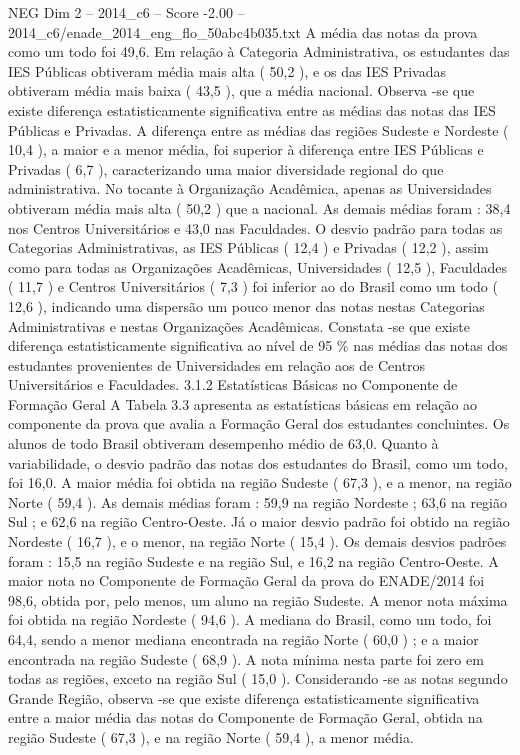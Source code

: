 \begin{textsample}{NEG Dim 2 – 2014\_c6 – Score -2.00 – 2014\_c6/enade\_2014\_eng\_flo\_50abc4b035.txt}
A média das notas da prova como um todo foi 49,6.
Em relação à Categoria Administrativa, os estudantes das IES Públicas obtiveram média mais alta ( 50,2 ), e os das IES Privadas obtiveram média mais baixa ( 43,5 ), que a média nacional.
Observa -se que existe diferença estatisticamente significativa entre as médias das notas das IES Públicas e Privadas.
A diferença entre as médias das regiões Sudeste e Nordeste ( 10,4 ), a maior e a menor média, foi superior à diferença entre IES Públicas e Privadas ( 6,7 ), caracterizando uma maior diversidade regional do que administrativa.
No tocante à Organização Acadêmica, apenas as Universidades obtiveram média mais alta ( 50,2 ) que a nacional.
As demais médias foram : 38,4 nos Centros Universitários e 43,0 nas Faculdades.
O desvio padrão para todas as Categorias Administrativas, as IES Públicas ( 12,4 ) e Privadas ( 12,2 ), assim como para todas as Organizações Acadêmicas, Universidades ( 12,5 ), Faculdades ( 11,7 ) e Centros Universitários ( 7,3 ) foi inferior ao do Brasil como um todo ( 12,6 ), indicando uma dispersão um pouco menor das notas nestas Categorias Administrativas e nestas Organizações Acadêmicas.
Constata -se que existe diferença estatisticamente significativa ao nível de 95 \% nas médias das notas dos estudantes provenientes de Universidades em relação aos de Centros Universitários e Faculdades. 3.1.2 Estatísticas Básicas no Componente de Formação Geral A Tabela 3.3 apresenta as estatísticas básicas em relação ao componente da prova que avalia a Formação Geral dos estudantes concluintes.
Os alunos de todo Brasil obtiveram desempenho médio de 63,0.
Quanto à variabilidade, o desvio padrão das notas dos estudantes do Brasil, como um todo, foi 16,0.
A maior média foi obtida na região Sudeste ( 67,3 ), e a menor, na região Norte ( 59,4 ).
As demais médias foram : 59,9 na região Nordeste ; 63,6 na região Sul ; e 62,6 na região Centro-Oeste.
Já o maior desvio padrão foi obtido na região Nordeste ( 16,7 ), e o menor, na região Norte ( 15,4 ).
Os demais desvios padrões foram : 15,5 na região Sudeste e na região Sul, e 16,2 na região Centro-Oeste.
A maior nota no Componente de Formação Geral da prova do ENADE/2014 foi 98,6, obtida por, pelo menos, um aluno na região Sudeste.
A menor nota máxima foi obtida na região Nordeste ( 94,6 ).
A mediana do Brasil, como um todo, foi 64,4, sendo a menor mediana encontrada na região Norte ( 60,0 ) ; e a maior encontrada na região Sudeste ( 68,9 ).
A nota mínima nesta parte foi zero em todas as regiões, exceto na região Sul ( 15,0 ).
Considerando -se as notas segundo Grande Região, observa -se que existe diferença estatisticamente significativa entre a maior média das notas do Componente de Formação Geral, obtida na região Sudeste ( 67,3 ), e na região Norte ( 59,4 ), a menor média.

\end{textsample}
